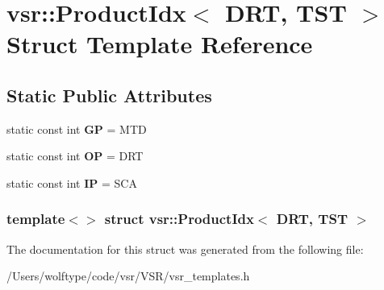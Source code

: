 \hypertarget{structvsr_1_1_product_idx_3_01_d_r_t_00_01_t_s_t_01_4}{\section{vsr\-:\-:Product\-Idx$<$ D\-R\-T, T\-S\-T $>$ Struct Template Reference}
\label{structvsr_1_1_product_idx_3_01_d_r_t_00_01_t_s_t_01_4}
}
\subsection*{Static Public Attributes}
\begin{DoxyCompactItemize}
\item 
\hypertarget{structvsr_1_1_product_idx_3_01_d_r_t_00_01_t_s_t_01_4_a778284089388cfadc6526309842363e3}{static const int {\bfseries G\-P} = M\-T\-D}\label{structvsr_1_1_product_idx_3_01_d_r_t_00_01_t_s_t_01_4_a778284089388cfadc6526309842363e3}

\item 
\hypertarget{structvsr_1_1_product_idx_3_01_d_r_t_00_01_t_s_t_01_4_a3d764e14963ea85901aa0f46bddb496a}{static const int {\bfseries O\-P} = D\-R\-T}\label{structvsr_1_1_product_idx_3_01_d_r_t_00_01_t_s_t_01_4_a3d764e14963ea85901aa0f46bddb496a}

\item 
\hypertarget{structvsr_1_1_product_idx_3_01_d_r_t_00_01_t_s_t_01_4_a168ed396092be5f538b266f42a3877c7}{static const int {\bfseries I\-P} = S\-C\-A}\label{structvsr_1_1_product_idx_3_01_d_r_t_00_01_t_s_t_01_4_a168ed396092be5f538b266f42a3877c7}

\end{DoxyCompactItemize}
\subsubsection*{template$<$$>$ struct vsr\-::\-Product\-Idx$<$ D\-R\-T, T\-S\-T $>$}



The documentation for this struct was generated from the following file\-:\begin{DoxyCompactItemize}
\item 
/\-Users/wolftype/code/vsr/\-V\-S\-R/vsr\-\_\-templates.\-h\end{DoxyCompactItemize}
